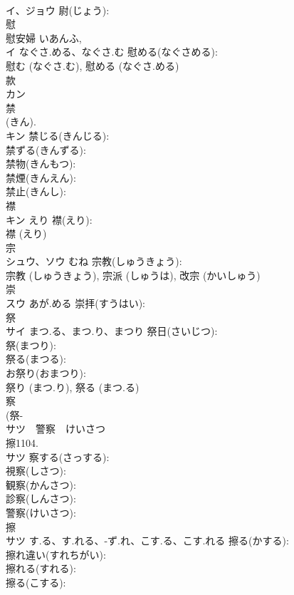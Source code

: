\documentclass[8pt]{extreport}
\begin{document}
\begin{CJK}{UTF8}{min}
\\	イ、ジョウ		尉(じょう): 
\\	慰			
\\	慰安婦 いあんふ, 
\\	イ	なぐさ.める、なぐさ.む	慰める(なぐさめる): 
\\	慰む (なぐさ.む), 慰める (なぐさ.める)
\\	款			
\\	カン			
\\	禁			
\\	(きん).
\\	キン		禁じる(きんじる): 
\\	禁ずる(きんずる): 
\\	禁物(きんもつ): 
\\	禁煙(きんえん): 
\\	禁止(きんし): 
\\	襟			
\\	キン	えり	襟(えり): 
\\	襟 (えり)
\\	宗			
\\	シュウ、ソウ	むね	宗教(しゅうきょう): 
\\	宗教 (しゅうきょう), 宗派 (しゅうは), 改宗 (かいしゅう)
\\	崇			
\\	スウ	あが.める	崇拝(すうはい): 
\\	祭			
\\	サイ	まつ.る、まつ.り、まつり	祭日(さいじつ): 
\\	祭(まつり): 
\\	祭る(まつる): 
\\	お祭り(おまつり): 
\\	祭り (まつ.り), 祭る (まつ.る)
\\	察			
\\	(祭-
\\	サツ　警察　けいさつ
\\	擦1104.	
\\	サツ		察する(さっする): 
\\	視察(しさつ): 
\\	観察(かんさつ): 
\\	診察(しんさつ): 
\\	警察(けいさつ): 
\\	擦			
\\	サツ	す.る、す.れる、-ず.れ、こす.る、こす.れる	擦る(かする): 
\\	擦れ違い(すれちがい): 
\\	擦れる(すれる): 
\\	擦る(こする): 

\end{CJK}
\end{document}
